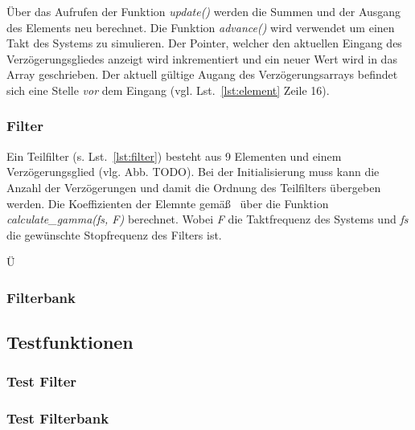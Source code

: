 Über das Aufrufen der Funktion \emph{update()} werden die Summen und der Ausgang des Elements neu berechnet. Die Funktion \emph{advance()} wird verwendet um einen Takt des Systems zu simulieren. Der Pointer, welcher den aktuellen Eingang des Verzögerungsgliedes anzeigt wird inkrementiert und ein neuer Wert wird in das Array geschrieben. Der aktuell gültige Augang des Verzögerungsarrays befindet sich eine Stelle \emph{vor} dem Eingang (vgl. Lst.~\ref{lst:element} Zeile 16).




\subsubsection{Filter}\label{sec:impl_Filter}
Ein Teilfilter (s. Lst.~\ref{lst:filter}) besteht aus 9 Elementen und einem Verzögerungsglied (vlg. Abb. TODO). Bei der Initialisierung muss kann die Anzahl der Verzögerungen und damit die Ordnung des Teilfilters übergeben werden. Die Koeffizienten der Elemnte gemäß~\cite{gaszi1983} über die Funktion \emph{calculate\_gamma(fs, F)} berechnet. Wobei \emph{F} die Taktfrequenz des Systems und \emph{fs} die gewünschte Stopfrequenz des Filters ist.

Ü


\subsubsection{Filterbank}\label{sec:impl_bank}

\subsection{Testfunktionen}\label{sec:impl_test}

\subsubsection{Test Filter}\label{sec:impl_testFilter}

\subsubsection{Test Filterbank}\label{sec:impl_testBank}

